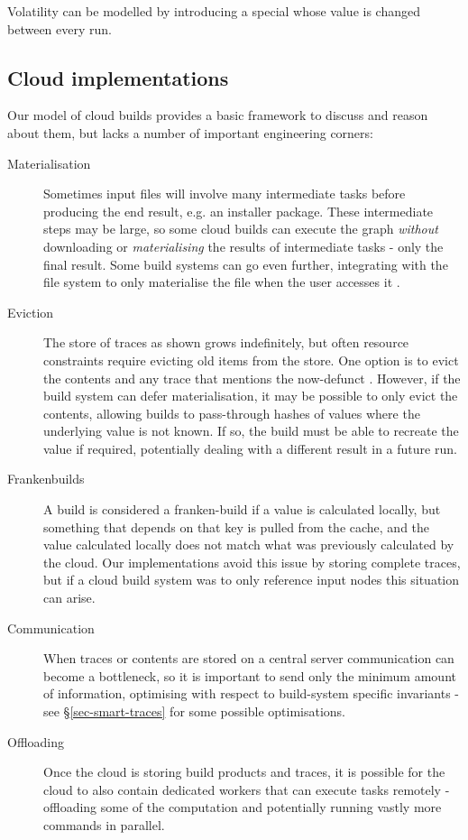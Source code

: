 Volatility can be modelled by introducing a special  whose value is changed between every run.

\subsection{Cloud implementations}\label{sec-cloud-aspects}

Our model of cloud builds provides a basic framework to discuss and reason about them, but lacks a number of important engineering corners:

\begin{description}
\item[Materialisation] Sometimes input files will involve many intermediate tasks before producing the end result, e.g. an installer package. These intermediate steps may be large, so some cloud builds can execute the graph \textit{without} downloading or \textit{materialising} the results of intermediate tasks - only the final result. Some build systems can go even further, integrating with the file system to only materialise the file when the user accesses it \cite{google_internal}.
\item[Eviction] The store of traces as shown grows indefinitely, but often resource constraints require evicting old items from the store. One option is to evict the contents and any trace that mentions the now-defunct . However, if the build system can defer materialisation, it may be possible to only evict the contents, allowing builds to pass-through hashes of values where the underlying value is not known. If so, the build must be able to recreate the value if required, potentially dealing with a different result in a future run.
\item[Frankenbuilds] A build is considered a franken-build \cite{cloudbuild} if a value is calculated locally, but something that depends on that key is pulled from the cache, and the value calculated locally does not match what was previously calculated by the cloud. Our implementations avoid this issue by storing complete traces, but if a cloud build system was to only reference input nodes this situation can arise.
\item[Communication] When traces or contents are stored on a central server communication can become a bottleneck, so it is important to send only the minimum amount of information, optimising with respect to build-system specific invariants - see \S\ref{sec-smart-traces} for some possible optimisations.
\item[Offloading] Once the cloud is storing build products and traces, it is possible for the cloud to also contain dedicated workers that can execute tasks remotely - offloading some of the computation and potentially running vastly more commands in parallel.
\end{description}

